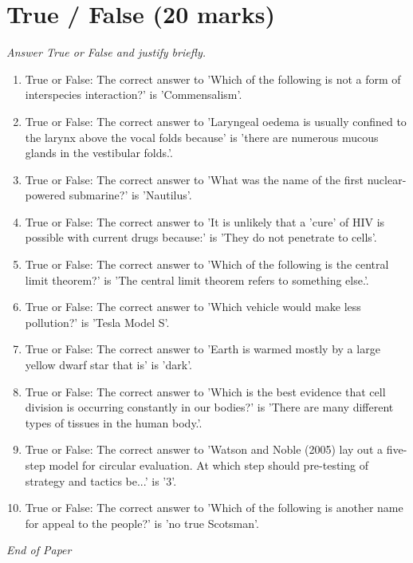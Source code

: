 \documentclass[12pt]{article}
\begin{document}
\section*{True / False (20 marks)}
\textit{Answer True or False and justify briefly.}
\begin{enumerate}[label=\arabic*.]
\item True or False: The correct answer to 'Which of the following is not a form of interspecies interaction?' is 'Commensalism'.
\item True or False: The correct answer to 'Laryngeal oedema is usually confined to the larynx above the vocal folds because' is 'there are numerous mucous glands in the vestibular folds.'.
\item True or False: The correct answer to 'What was the name of the first nuclear-powered submarine?' is 'Nautilus'.
\item True or False: The correct answer to 'It is unlikely that a 'cure' of HIV is possible with current drugs because:' is 'They do not penetrate to cells'.
\item True or False: The correct answer to 'Which of the following is the central limit theorem?' is 'The central limit theorem refers to something else.'.
\item True or False: The correct answer to 'Which vehicle would make less pollution?' is 'Tesla Model S'.
\item True or False: The correct answer to 'Earth is warmed mostly by a large yellow dwarf star that is' is 'dark'.
\item True or False: The correct answer to 'Which is the best evidence that cell division is occurring constantly in our bodies?' is 'There are many different types of tissues in the human body.'.
\item True or False: The correct answer to 'Watson and Noble (2005) lay out a five-step model for circular evaluation. At which step should pre-testing of strategy and tactics be...' is '3'.
\item True or False: The correct answer to 'Which of the following is another name for appeal to the people?' is 'no true Scotsman'.
\end{enumerate}

\vfill
\noindent\textit{End of Paper}
\end{document}
